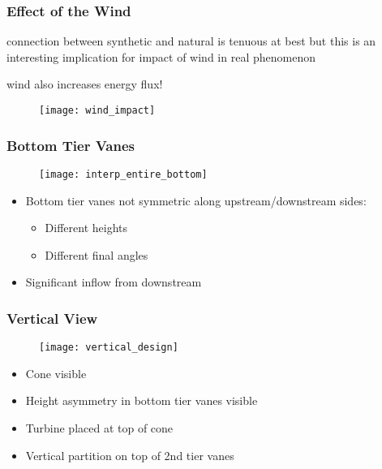 \documentclass[mathserif]{beamer}
\begin{document}
%
%
%
\begin{frame}
 \frametitle{Effect of the Wind}

 connection between synthetic and natural is tenuous at best but this is
 an interesting implication for impact of wind in real phenomenon
 
wind also increases energy flux!

 \begin{figure}[htb]
  \centering
  \texttt{[image: wind\_impact]}
 \end{figure}
 
\end{frame}

%
%
%
\begin{frame}
 \frametitle{Bottom Tier Vanes}
    \begin{figure}[htb]
     \centering
     \texttt{[image: interp\_entire\_bottom]}
    \end{figure}
 
 \begin{block}{}
  \begin{itemize}
   \item Bottom tier vanes not symmetric along upstream/downstream
	 sides:
	 \begin{itemize}
	  \item Different heights
	  \item Different final angles
	 \end{itemize}
   \item Significant inflow from downstream
  \end{itemize}
 \end{block}
\end{frame}

%
%
%
\begin{frame}
 \frametitle{Vertical View}
    \begin{figure}[htb]
     \centering
     \texttt{[image: vertical\_design]}
    \end{figure}
 
 \begin{block}{}
  \begin{itemize}
   \item Cone visible
   \item Height asymmetry in bottom tier vanes visible
   \item Turbine placed at top of cone
   \item Vertical partition on top of 2nd tier vanes 
  \end{itemize}
 \end{block}
\end{frame}
\end{document}
